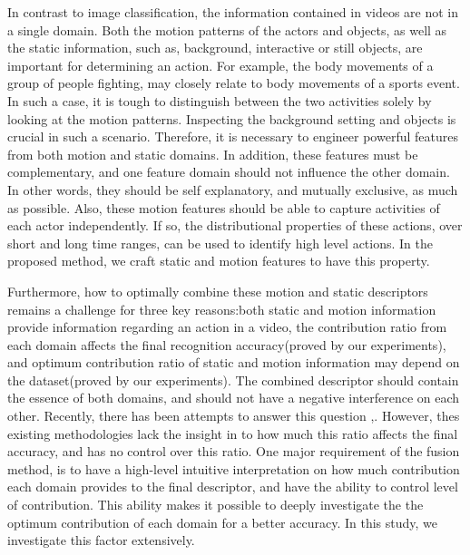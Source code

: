 In contrast to image classification, the information contained in videos
are not
 in a single domain. Both the motion patterns of the actors and objects, as well as the static
 information, such as, background, interactive or still objects, are important for determining an action.
For example, the body movements of a group of people fighting, may closely relate to
body movements of a sports event. In such a case, it is tough to distinguish between the two
activities solely by looking at the motion patterns. Inspecting the background setting
and objects is crucial in such a scenario. Therefore, it is necessary to engineer powerful features
from both motion and static domains. In addition, these features must be complementary, and one feature domain should
not influence the other domain. In other words, they should be self explanatory, and mutually exclusive, as much as possible.
Also, these motion features should be able to capture
activities of each actor independently. If so, the distributional properties of these actions, over short
and long time ranges, can be used to identify high level actions. In the proposed method, we craft static and motion features to have this property.

Furthermore, how to optimally combine these motion and static descriptors remains a challenge for three key reasons:both static and motion information
provide information regarding an action in a video, the contribution ratio from each domain affects the final recognition accuracy(proved by our experiments),
and optimum contribution ratio of static and motion information may depend on the dataset(proved by our experiments).
The combined descriptor should contain the essence of both domains, and should not have a
negative interference on each other. Recently, there has been attempts to answer this question \cite{7486474},\cite{simonyan2014two}. However,
thes existing methodologies lack the insight in to how much this ratio affects the final accuracy, and has no control over this ratio.
One major requirement of the fusion method, is to have a high-level intuitive interpretation on how much contribution each domain provides to the
final descriptor, and have the ability to control level of contribution. This ability makes it possible
to deeply investigate the the optimum contribution of each domain for a better accuracy. In this study, we investigate this factor
extensively.

